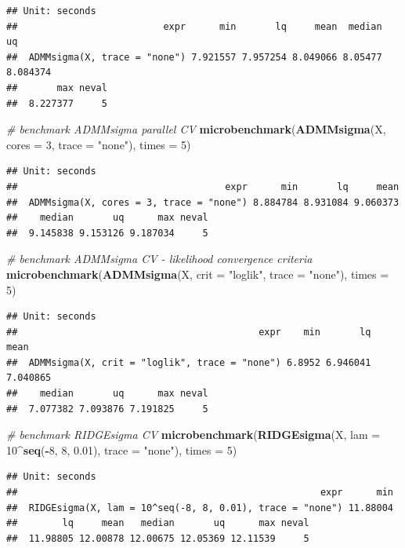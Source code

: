 \documentclass[12pt,]{book}
\newenvironment{Shaded}{\begin{snugshade}}{\end{snugshade}}
\newcommand{\CommentTok}[1]{\textcolor[rgb]{0.56,0.35,0.01}{\textit{#1}}}
\newcommand{\DataTypeTok}[1]{\textcolor[rgb]{0.13,0.29,0.53}{#1}}
\newcommand{\DecValTok}[1]{\textcolor[rgb]{0.00,0.00,0.81}{#1}}
\newcommand{\FloatTok}[1]{\textcolor[rgb]{0.00,0.00,0.81}{#1}}
\newcommand{\KeywordTok}[1]{\textcolor[rgb]{0.13,0.29,0.53}{\textbf{#1}}}
\newcommand{\NormalTok}[1]{#1}
\newcommand{\OperatorTok}[1]{\textcolor[rgb]{0.81,0.36,0.00}{\textbf{#1}}}
\newcommand{\StringTok}[1]{\textcolor[rgb]{0.31,0.60,0.02}{#1}}
\theoremstyle{definition}
\theoremstyle{definition}
\theoremstyle{definition}
\theoremstyle{remark}
\begin{document}
\begin{verbatim}
## Unit: seconds
##                          expr      min       lq     mean  median       uq
##  ADMMsigma(X, trace = "none") 7.921557 7.957254 8.049066 8.05477 8.084374
##       max neval
##  8.227377     5
\end{verbatim}

\begin{Shaded}
\begin{Highlighting}[]
\CommentTok{# benchmark ADMMsigma parallel CV}
\KeywordTok{microbenchmark}\NormalTok{(}\KeywordTok{ADMMsigma}\NormalTok{(X, }\DataTypeTok{cores =} \DecValTok{3}\NormalTok{, }\DataTypeTok{trace =} \StringTok{"none"}\NormalTok{), }\DataTypeTok{times =} \DecValTok{5}\NormalTok{)}
\end{Highlighting}
\end{Shaded}

\begin{verbatim}
## Unit: seconds
##                                     expr      min       lq     mean
##  ADMMsigma(X, cores = 3, trace = "none") 8.884784 8.931084 9.060373
##    median       uq      max neval
##  9.145838 9.153126 9.187034     5
\end{verbatim}

\begin{Shaded}
\begin{Highlighting}[]
\CommentTok{# benchmark ADMMsigma CV - likelihood convergence criteria}
\KeywordTok{microbenchmark}\NormalTok{(}\KeywordTok{ADMMsigma}\NormalTok{(X, }\DataTypeTok{crit =} \StringTok{"loglik"}\NormalTok{, }\DataTypeTok{trace =} \StringTok{"none"}\NormalTok{), }\DataTypeTok{times =} \DecValTok{5}\NormalTok{)}
\end{Highlighting}
\end{Shaded}

\begin{verbatim}
## Unit: seconds
##                                           expr    min       lq     mean
##  ADMMsigma(X, crit = "loglik", trace = "none") 6.8952 6.946041 7.040865
##    median       uq      max neval
##  7.077382 7.093876 7.191825     5
\end{verbatim}

\begin{Shaded}
\begin{Highlighting}[]
\CommentTok{# benchmark RIDGEsigma CV}
\KeywordTok{microbenchmark}\NormalTok{(}\KeywordTok{RIDGEsigma}\NormalTok{(X, }\DataTypeTok{lam =} \DecValTok{10}\OperatorTok{^}\KeywordTok{seq}\NormalTok{(}\OperatorTok{-}\DecValTok{8}\NormalTok{, }\DecValTok{8}\NormalTok{, }\FloatTok{0.01}\NormalTok{), }\DataTypeTok{trace =} \StringTok{"none"}\NormalTok{), }\DataTypeTok{times =} \DecValTok{5}\NormalTok{)}
\end{Highlighting}
\end{Shaded}

\begin{verbatim}
## Unit: seconds
##                                                      expr      min
##  RIDGEsigma(X, lam = 10^seq(-8, 8, 0.01), trace = "none") 11.88004
##        lq     mean   median       uq      max neval
##  11.98805 12.00878 12.00675 12.05369 12.11539     5
\end{verbatim}


\end{document}
